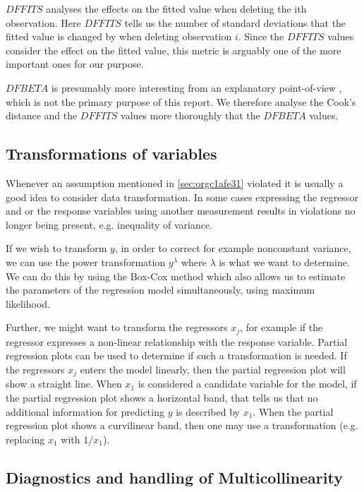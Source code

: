 \documentclass[11pt]{article}
\begin{document}
\(DFFITS\) analyses the effects on the fitted value when deleting the ith observation. Here \(DFFITS\) tells us
the number of standard deviations that the fitted value is changed by when deleting observation \(i\). Since 
the \(DFFITS\) values consider the effect on the fitted value, this metric is arguably one of the more important 
ones for our purpose.

\(DFBETA\) is presumably more interesting from an explanatory point-of-view \cite{22286}, which is not the
primary purpose of this report. We therefore analyse the Cook's distance and the \(DFFITS\) values more
thoroughly that the \(DFBETA\) values.

\subsection{Transformations of variables}
\label{sec:org14d3cec}

Whenever an assumption mentioned in \ref{sec:orgc1afe31} violated it is usually a good idea to consider data 
transformation. In some cases expressing the regressor and or the response variables using another measurement
results in violations no longer being present, e.g. inequality of variance. 

If we wish to transform \(y\), in order to correct for example nonconstant variance, we can use the power
transformation \(y^\lambda\) where \(\lambda\) is what we want to determine. We can do this by using the Box-Cox method
which also allows us to estimate the parameters of the regression model simultaneously, using maximum likelihood.

Further, we might want to transform the regressors \(x_j\), for example if the regressor expresses a non-linear 
relationship with the response variable. Partial regression plots can be used to determine if such a transformation
is needed. If the regressors \(x_j\) enters the model linearly, then the partial regression plot will show a
straight line. When \(x_1\) is considered a candidate variable for the model, if the
partial regression plot shows a horizontal band, that tells us that no additional information for predicting \(y\) is 
described by \(x_1\). When the partial regression plot shows a curvilinear band, then one may use a transformation 
(e.g. replacing \(x_1\) with \(1/x_1\)).

\subsection{Diagnostics and handling of Multicollinearity}
\label{sec:org3201095}
\end{document}
